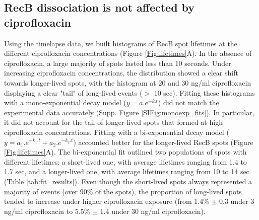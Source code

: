 \subsection*{RecB dissociation is not affected by ciprofloxacin}

Using the timelapse data, we built histograms of RecB spot lifetimes at the different ciprofloxacin concentrations (Figure \ref{Fig:lifetimes}A). In the absence of ciprofloxacin, a large majority of spots lasted less than 10 seconds. Under increasing ciprofloxacin concentrations, the distribution showed a clear shift towards longer-lived spots, with the histogram at 20 and 30 ng/ml ciprofloxacin displaying a clear "tail" of long-lived events ($>$ 10 sec). Fitting these histograms with a mono-exponential decay model ($y = a.e^{-k.t}$) did not match the experimental data accurately (Supp. Figure \ref{SIFig:monoexp_fits}). In particular, it did not account for the tail of longer-lived spots that formed at high ciprofloxacin concentrations. Fitting with a bi-exponential decay model ($y = a_1.e^{-k_1.t} + a_2.e^{-k_2.t}$) accounted better for the longer-lived RecB spots (Figure \ref{Fig:lifetimes}A). The bi-exponential fit outlined two populations of spots with different lifetimes: a short-lived one, with average lifetimes ranging from 1.4 to 1.7 sec, and a longer-lived one, with average lifetimes ranging from 10 to 14 sec (Table \ref{tab:fit_results}). Even though the short-lived spots always represented a majority of events (over 90\% of the spots), the proportion of long-lived spots tended to increase under higher ciprofloxacin exposure (from 1.4\% $\pm$ 0.3 under 3 ng/ml ciprofloxacin to 5.5\% $\pm$ 1.4 under 30 ng/ml ciprofloxacin).

